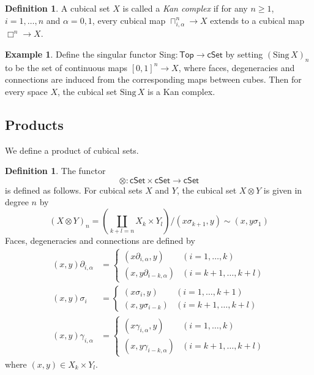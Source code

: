\documentclass[oneside, 12pt]{amsart}
\numberwithin{equation}{section}
\theoremstyle{plain}
\theoremstyle{definition}
\newtheorem{definition}[theorem]{Definition}
\newtheorem{example}[theorem]{Example}
\theoremstyle{remark}
\newcommand{\cSet}{\mathsf{cSet}}
\begin{document}
	
	
	\begin{definition}
		A cubical set $X$ is called a \emph{Kan complex} if for any $n\ge 1$, $i=1,\ldots,n$ and $\alpha=0,1$, every cubical map $\sqcap_{i,\alpha}^n\to X$ extends to a cubical map $\Box^n\to X$.
	\end{definition}
	
	
	
	\begin{example}
		Define the singular functor $\mathrm{Sing}\colon\mathsf{Top}\to\cSet$ by setting $(\mathrm{Sing}\,X)_n$ to be the set of continuous maps $[0,1]^n\to X$, where faces, degeneracies and connections are induced from the corresponding maps between cubes. Then for every space $X$, the cubical set $\mathrm{Sing}\,X$ is a Kan complex.
	\end{example}
	
	
	
	\subsection{Products}
	
	We define a product of cubical sets.
	
	\begin{definition}
		The functor
		\[
		\otimes\colon\cSet\times\cSet\to\cSet
		\]
		is defined as follows. For cubical sets $X$ and $Y$, the cubical set $X\otimes Y$ is given in degree $n$ by
		\[
		(X\otimes Y)_n=\left(\coprod_{k+l=n}X_k\times Y_l\right)/(x\sigma_{k+1},y)\sim(x,y\sigma_1)
		\]
		Faces, degeneracies and connections are defined by
		\begin{align*}
			(x,y)\partial_{i,\alpha}&=
			\begin{cases}
				(x\partial_{i,\alpha},y)&(i=1,\ldots,k)\\
				(x,y\partial_{i-k,\alpha})&(i=k+1,\ldots,k+l)
			\end{cases}\\
			(x,y)\sigma_i&=
			\begin{cases}
				(x\sigma_i,y)&(i=1,\ldots,k+1)\\
				(x,y\sigma_{i-k})&(i=k+1,\ldots,k+l)
			\end{cases}\\
			(x,y)\gamma_{i,\alpha}&=
			\begin{cases}
				(x\gamma_{i,\alpha},y)&(i=1,\ldots,k)\\
				(x,y\gamma_{i-k,\alpha})&(i=k+1,\ldots,k+l)
			\end{cases}
		\end{align*}
		where $(x,y)\in X_k\times Y_l$.
	\end{definition}
	
\end{document}
